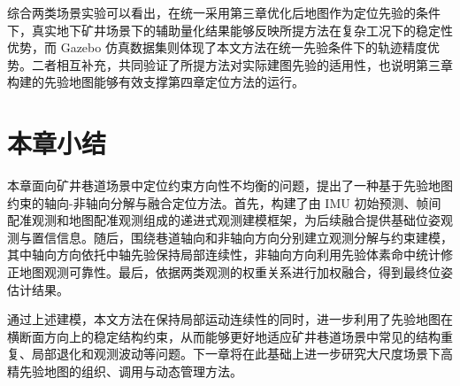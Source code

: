 综合两类场景实验可以看出，在统一采用第三章优化后地图作为定位先验的条件下，真实地下矿井场景下的辅助量化结果能够反映所提方法在复杂工况下的稳定性优势，而 Gazebo 仿真数据集则体现了本文方法在统一先验条件下的轨迹精度优势。二者相互补充，共同验证了所提方法对实际建图先验的适用性，也说明第三章构建的先验地图能够有效支撑第四章定位方法的运行。

\section{本章小结}

本章面向矿井巷道场景中定位约束方向性不均衡的问题，提出了一种基于先验地图约束的轴向-非轴向分解与融合定位方法。首先，构建了由 IMU 初始预测、帧间配准观测和地图配准观测组成的递进式观测建模框架，为后续融合提供基础位姿观测与置信信息。随后，围绕巷道轴向和非轴向方向分别建立观测分解与约束建模，其中轴向方向依托中轴先验保持局部连续性，非轴向方向利用先验体素命中统计修正地图观测可靠性。最后，依据两类观测的权重关系进行加权融合，得到最终位姿估计结果。

通过上述建模，本文方法在保持局部运动连续性的同时，进一步利用了先验地图在横断面方向上的稳定结构约束，从而能够更好地适应矿井巷道场景中常见的结构重复、局部退化和观测波动等问题。下一章将在此基础上进一步研究大尺度场景下高精先验地图的组织、调用与动态管理方法。
